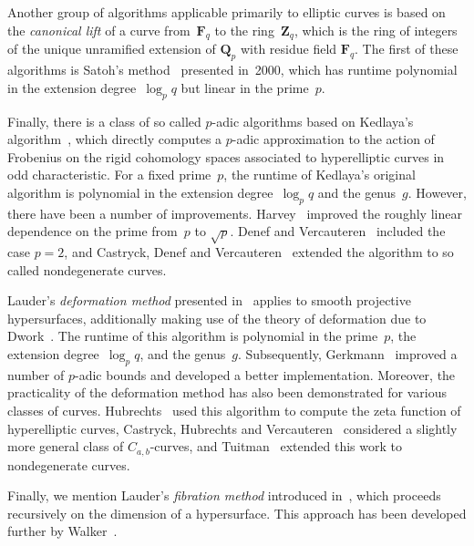 Another group of algorithms applicable primarily to elliptic curves 
is based on the \emph{canonical lift} of a curve from~$\mathbf{F}_{q}$ 
to the ring~$\mathbf{Z}_{q}$, which is the ring of integers of the 
unique unramified extension of $\mathbf{Q}_{p}$ with residue field 
$\mathbf{F}_{q}$.  The first of these algorithms is Satoh's 
method~\citep{Satoh2000} presented in~2000, which has runtime 
polynomial in the extension degree~$\log_{p} q$ but linear in the prime~$p$.

Finally, there is a class of so called $p$-adic algorithms based on 
Kedlaya's algorithm~\citep{Kedlaya2001}, which directly computes a 
$p$-adic approximation to the action of Frobenius on the rigid cohomology 
spaces associated to hyperelliptic curves in odd characteristic.  
For a fixed prime~$p$, the runtime of Kedlaya's original algorithm 
is polynomial in the extension degree~$\log_{p} q$ and the genus~$g$.  
However, there have been a number of improvements.  Harvey~\citep{Harvey2007} 
improved the roughly linear dependence on the prime from~$p$ to $\sqrt{p}$.  
Denef and Vercauteren~\citep{DenVer2006} included the case $p = 2$, and 
Castryck, Denef and Vercauteren~\citep{CasDenVer2006} extended the algorithm 
to so called nondegenerate curves.

Lauder's \emph{deformation method} presented in~\citep{Lau04a} 
applies to smooth projective hypersurfaces, additionally making use 
of the theory of deformation due to Dwork~\citep{Dwork62b}.  The 
runtime of this algorithm is polynomial in the prime~$p$, the 
extension degree~$\log_{p} q$, and the genus~$g$.  Subsequently, 
Gerkmann~\citep{Gerkmann2007} improved a number of $p$-adic bounds 
and developed a better implementation.  Moreover, the practicality 
of the deformation method has also been demonstrated for various 
classes of curves.  Hubrechts~\citep{Hubrechts2007, Hubrechts2008} 
used this algorithm to compute the zeta function of hyperelliptic curves, 
Castryck, Hubrechts and Vercauteren~\citep{CasHubVer2008} considered 
a slightly more general class of $C_{a,b}$-curves, and 
Tuitman~\citep{Tuitman2011} extended this work to nondegenerate curves. 

Finally, we mention Lauder's \emph{fibration method} introduced 
in~\citep{Lauder2006}, which proceeds recursively on the dimension 
of a hypersurface.  This approach has been developed further 
by Walker~\citep{Walker2009}.


